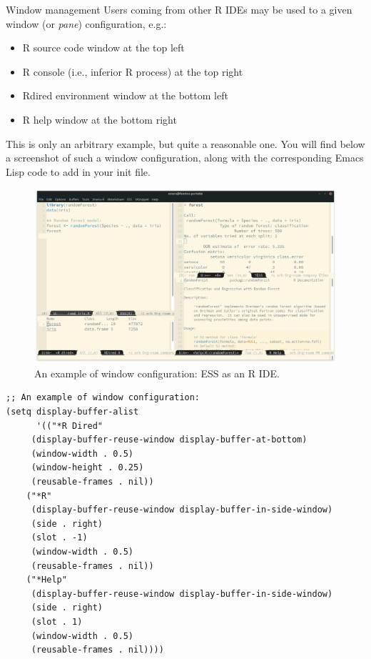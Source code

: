 \documentclass[presentation]{beamer}
\begin{document}
\begin{frame}[fragile,allowframebreaks,label=]{Window management}
 Users coming from other R IDEs may be used to a given window (or \emph{pane}) configuration, e.g.:
\begin{itemize}
\item R source code window at the top left
\item R console (i.e., inferior R process) at the top right
\item Rdired environment window at the bottom left
\item R help window at the bottom right
\end{itemize}

This is only an arbitrary example, but quite a reasonable one. You will find below a screenshot of such a window configuration, along with the corresponding Emacs Lisp code to add in your init file.

\pagebreak

\begin{figure}[htbp]
\centering
\includegraphics[width=0.96 \textwidth]{./images/window_config.png}
\caption{\label{fig:org18bed30}An example of window configuration: ESS as an R IDE.}
\end{figure}

\pagebreak

\begin{verbatim}
;; An example of window configuration:
(setq display-buffer-alist
      '(("*R Dired"
	 (display-buffer-reuse-window display-buffer-at-bottom)
	 (window-width . 0.5)
	 (window-height . 0.25)
	 (reusable-frames . nil))
	("*R"
	 (display-buffer-reuse-window display-buffer-in-side-window)
	 (side . right)
	 (slot . -1)
	 (window-width . 0.5)
	 (reusable-frames . nil))
	("*Help"
	 (display-buffer-reuse-window display-buffer-in-side-window)
	 (side . right)
	 (slot . 1)
	 (window-width . 0.5)
	 (reusable-frames . nil))))
\end{verbatim}
\end{frame}
\end{document}
